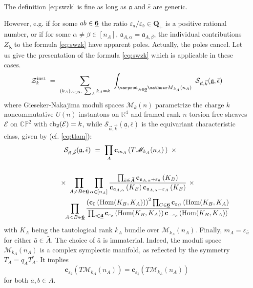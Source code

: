 \documentclass[12pt]{amsart}
\newcommand {\3}{\underline{\bf 3}}
\newcommand {\4}{\underline{\bf 4}}
\newcommand {\6}{\underline{\bf 6}}
\newcommand{\beq}{\begin{equation}}
\newcommand{\eeq}{\end{equation}}
\newcommand{\iM}{{\mathscr M}}
\newcommand {\BC}   {\mathbb C}
\newcommand {\BR}   {\mathbb R}
\newcommand {\BP}   {\mathbb P}
\newcommand {\bQ}   {\mathbf{Q}}
\newcommand {\ba}  {\underline{\ac}}
\newcommand {\cb} {\mathbf{c}}
\newcommand {\bla} {\underline{\boldsymbol{\lambda}}}
\newcommand {\ac} {\mathfrak{a}}
\newcommand {\CalS} {\mathcal S}
\newcommand {\CalZ} {\mathcal Z}
\newcommand{\ve}{\varepsilon}
\newcommand{\ep}{\epsilon}
\newcommand{\subsubsec}[1]{\subsubsection{\uwave{\sl #1}}}
\begin{document}
\subsubsec{More general definition}

The definition \eqref{eq:swzk} is fine as long as ${\ba}$ and ${\bar\ve}$ are generic.

However, e.g. if for some $ab \in {\6}$ the ratio ${\ve}_{a}/{\ve}_{b} \in {\bQ}_{+}$
is a positive rational number, or if for some ${\alpha} \neq {\beta} \in [n_A]$, ${\ac}_{A, {\alpha}} = {\ac}_{A, {\beta}}$, the individual contributions $Z_{\bla}$ to the formula \eqref{eq:swzk} have apparent poles. 
Actually, the poles cancel. Let us give the presentation of the formula \eqref{eq:swzk}
which is applicable in these cases. 
\beq
{\CalZ}^{\rm inst}_{k} \ = \ \sum_{(k_{A})_{A \in {\6}}, \ \sum_{A} k_{A} = k}\
\int_{\varprod_{A \in {\6}} {\iM}_{k_{A}}(n_{A})} \ {\CalS}_{\vec n, \vec k} ({\ba}, {\bar\ep})
\label{eq:spikedint}
\eeq
where Gieseker-Nakajima moduli  spaces ${\iM}_{k}(n)$ parametrize the charge $k$ noncommutative $U(n)$ instantons on ${\BR}^{4}$ 
and  framed rank $n$ torsion free sheaves $\mathcal{E}$
on ${\BC\BP}^{2}$ with ${\rm ch}_{2}({\mathcal{E}}) = k$, while ${\CalS}_{\vec n, \vec k} ({\ba}, {\bar\ep})$ is the equivariant characteristic class, given by (cf. \eqref{eq:tlam}):
\begin{multline}
{\CalS}_{\vec n, \vec k} ({\ba}, {\bar\ep}) \ = \ \prod_{A} {\cb}_{m_{A}}\left( T{\iM}_{k_{A}}(n_{A})\, \right) \ \times \qquad  \\
\\ \ \times\ \prod_{A \neq B \in {\6}} \prod_{{\alpha} \in [n_{A}]} \frac{\prod_{{\bar a} \in {\bar A}}   {\cb}_{{\ac}_{A, {\alpha}}+ {\ve}_{\bar a}} \left( K_{B} \right)}{ {\cb}_{{\ac}_{A, {\alpha}}} \left(  K_{B} \right) {{\cb}_{{\ac}_{A, {\alpha}}-{\ve}_{A}} \left( K_{B} \right)} }  \ \times \, \\ \qquad\qquad\qquad
 \prod_{A < B \in {\6}} \frac{\left( {\cb}_{0} \left( {\rm Hom}( K_{B} , K_{A} )\right) \right)^2  \prod_{C \in {\6}} {\cb}_{{\ve}_{C}}\left( {\rm Hom} ( K_{B} , K_{A} \right)}{\prod_{c \in {\4}} {\cb}_{{\ve}_{c}} \left( {\rm Hom} ( K_{B} , K_{A} ) \right) {\cb}_{-{\ve}_{c}} \left( {\rm Hom} ( K_{B} , K_{A} ) \right)}  \\
\end{multline}
with $K_{A}$ being the tautological rank $k_{A}$ bundle over ${\iM}_{k_{A}}(n_{A})$.
Finally, $m_{A} = {\ve}_{\bar a}$ for  either ${\bar a} \in {\bar A}$. The choice of $\bar a$ is immaterial. Indeed,  
the moduli space ${\iM}_{k_{A}}(n_{A})$ is a complex symplectic manifold, as reflected by the symmetry $T_{A} = q_{A} T_{A}^{*}$. It implies
\beq
{\cb}_{{\ve}_{\bar a}} \left( T{\iM}_{k_{A}}(n_{A}) \right) = {\cb}_{{\ve}_{\bar b}} \left( T{\iM}_{k_{A}}(n_{A}) \right)\eeq
for both ${\bar a}, {\bar b} \in {\bar A}$. 
\end{document}
